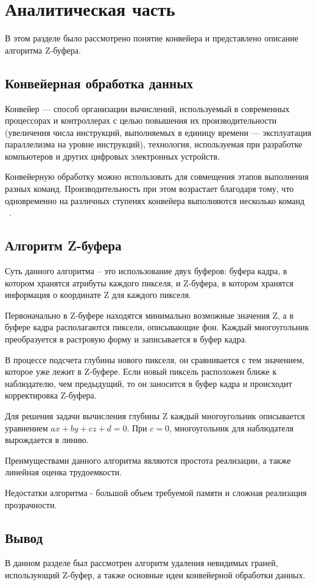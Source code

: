 \chapter{Аналитическая часть}
В этом разделе было рассмотрено понятие конвейера и представлено описание алгоритма Z-буфера.

\section{Конвейерная обработка данных}

Конвейер — способ организации вычислений, используемый в современных процессорах и контроллерах с целью повышения их производительности (увеличения числа инструкций, выполняемых в единицу времени — эксплуатация параллелизма на уровне инструкций), технология, используемая при разработке компьютеров и других цифровых электронных
устройств.

Конвейерную обработку можно использовать для совмещения этапов выполнения разных команд. Производительность при этом возрастает благодаря тому, что одновременно на различных ступенях конвейера выполняются несколько команд ~\cite{second_article}.



\section{Алгоритм Z-буфера}

Суть данного алгоритма -- это использование двух буферов: буфера
кадра, в котором хранятся атрибуты каждого пикселя, и Z-буфера, в котором
хранятся информация о координате Z для каждого пикселя.

Первоначально в Z-буфере находятся минимально возможные значения
Z, а в буфере кадра располагаются пиксели, описывающие фон. Каждый
многоугольник преобразуется в растровую форму и записывается в буфер
кадра.

В процессе подсчета глубины нового пикселя, он сравнивается с тем
значением, которое уже лежит в Z-буфере. Если новый пиксель расположен
ближе к наблюдателю, чем предыдущий, то он заносится в буфер кадра и
происходит корректировка Z-буфера.

Для решения задачи вычисления глубины Z каждый многоугольник
описывается уравнением $ax + by + cz + d = 0$. При $c = 0$, многоугольник для
наблюдателя вырождается в линию.

Преимуществами данного алгоритма являются простота реализации, а также линейная оценка трудоемкости.

Недостатки алгоритма - большой объем требуемой памяти и сложная реализация прозрачности.

\section*{Вывод}

В данном разделе был рассмотрен алгоритм удаления невидимых граней, использующий Z-буфер, а также основные идеи конвейерной обработки данных.
